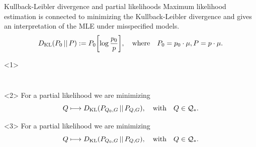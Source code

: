 \documentclass[smaller]{beamer}\usepackage{listings}
\begin{document}
\begin{frame}[label={sec:orgf097ea3}]{Kullback-Leibler divergence and partial likelihoods}
\small Maximum likelihood estimation is connected to minimizing the Kullback-Leibler
divergence and gives an interpretation of the MLE under misspecified models.
\begin{equation*}
  D_{\mathrm{KL}}(P_0 \, || \, P) := P_0
  {\left[
    \log \frac{p_0}{p}
  \right]},
  \quad \text{where} \quad
  P_0 = p_0 \cdot \mu,   P = p \cdot \mu.
\end{equation*}

\begin{onlyenv}<1>
\phantom{For a partial likelihood we are minimizing}
\begin{equation*}
 \phantom{  Q \longmapsto \KL(P_{Q_0,G} \, || \, P_{Q,G}), \quad \text{with} \quad Q \in \mathcal{Q}_*.}
\end{equation*}

\vfill

\end{onlyenv}

\begin{onlyenv}<2>
For a partial likelihood we are minimizing
\begin{equation*}
  Q \longmapsto D_{\mathrm{KL}}(P_{Q_0,G} \, || \, P_{Q,G}),
  \quad \text{with} \quad Q \in \mathcal{Q}_*.
\end{equation*}

\vfill

\end{onlyenv}

\begin{onlyenv}<3>
For a partial likelihood we are minimizing
\begin{equation*}
  Q \longmapsto D_{\mathrm{KL}}(P_{Q_0,G} \, || \, P_{Q,G}),
  \quad \text{with} \quad Q \in \mathcal{Q}_*.
\end{equation*}


\end{onlyenv}
\end{frame}
\end{document}
